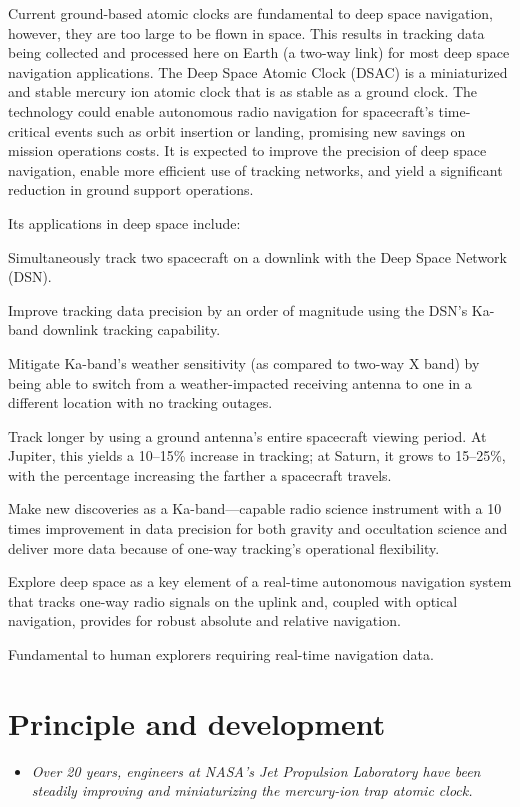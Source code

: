 Current ground-based atomic clocks are fundamental to deep space
navigation, however, they are too large to be flown in space. This
results in tracking data being collected and processed here on Earth (a
two-way link) for most deep space navigation applications. The Deep
Space Atomic Clock (DSAC) is a miniaturized and stable mercury ion
atomic clock that is as stable as a ground clock. The technology could
enable autonomous radio navigation for spacecraft's time-critical events
such as orbit insertion or landing, promising new savings on mission
operations costs. It is expected to improve the precision of deep space
navigation, enable more efficient use of tracking networks, and yield a
significant reduction in ground support operations.

Its applications in deep space include:

Simultaneously track two spacecraft on a downlink with the Deep Space
Network (DSN).

Improve tracking data precision by an order of magnitude using the DSN's
Ka-band downlink tracking capability.

Mitigate Ka-band's weather sensitivity (as compared to two-way X band)
by being able to switch from a weather-impacted receiving antenna to one
in a different location with no tracking outages.

Track longer by using a ground antenna's entire spacecraft viewing
period. At Jupiter, this yields a 10--15\% increase in tracking; at
Saturn, it grows to 15--25\%, with the percentage increasing the farther
a spacecraft travels.

Make new discoveries as a Ka-band---capable radio science instrument
with a 10 times improvement in data precision for both gravity and
occultation science and deliver more data because of one-way tracking's
operational flexibility.

Explore deep space as a key element of a real-time autonomous navigation
system that tracks one-way radio signals on the uplink and, coupled with
optical navigation, provides for robust absolute and relative
navigation.

Fundamental to human explorers requiring real-time navigation data.

\section{Principle and development}\label{principle-and-development}

\begin{itemize}
\item
  \emph{Over 20 years, engineers at NASA's Jet Propulsion Laboratory
  have been steadily improving and miniaturizing the mercury-ion trap
  atomic clock.}
\end{itemize}

